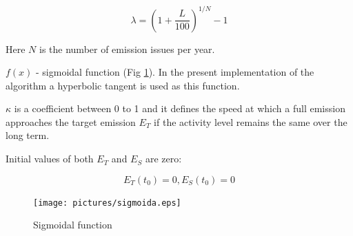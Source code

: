 \documentclass[a4paper,12pt]{article}
\begin{document}
$$
    \lambda = (1 + \frac{L}{100})^{1/N}-1
$$

Here $N$ is the number of emission issues per year.


$f(x)$ - sigmoidal function (Fig \ref{fig:sigmoida}). In the present implementation of the algorithm a hyperbolic tangent is used as this function. 


$\kappa$ is a coefficient between 0 to 1 and it defines the speed at which a full emission approaches the target emission $E_T$ if the activity level remains the same over the long term.


Initial values of both $E_T$ and $E_S$ are zero:


$$
E_T(t_0)=0, E_S(t_0)=0
$$


\begin{figure}[h]
      \texttt{[image: pictures/sigmoida.eps]}
      \caption{Sigmoidal function}
      \label{fig:sigmoida}
\end{figure}
\end{document}
